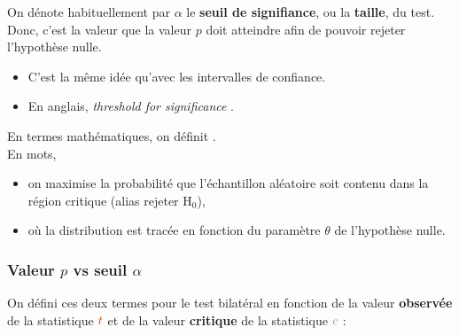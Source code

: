 \documentclass[10pt, french]{article}
\begin{document}
\begin{multicols*}{2}
\begin{definitionNOHFILLsub}
On dénote habituellement par $\alpha$ le \textbf{seuil de signifiance}, ou la \textbf{taille}, du test. Donc, c'est la valeur que la valeur $p$ doit atteindre afin de pouvoir rejeter l'hypothèse nulle.

\begin{itemize}
	\item	C'est la même idée qu'avec les intervalles de confiance. 
	\item	En anglais, \og \textit{threshold for significance} \fg{}.
\end{itemize}

\bigskip

En termes mathématiques, on définit . \\

En mots, 
\begin{itemize}
	\item	on \textcolor{indigo(web)}{maximise} la probabilité que \textcolor{bondiblue!80!black}{l'échantillon aléatoire} soit \textcolor{armygreen}{contenu} dans \textcolor{bulgarianrose!90!black}{la région critique} (alias rejeter $\textrm{H}_{0}$), 
	\item	où la distribution est tracée \textcolor{amethyst}{en fonction du paramètre $\theta$} de \textcolor{pastelred}{l'hypothèse nulle}.
\end{itemize}
\end{definitionNOHFILLsub}



\subsubsection{Valeur $p$ vs seuil $\alpha$}
On défini ces deux termes pour le test bilatéral en fonction de la valeur \textbf{\textcolor{burntorange}{observée}} de la statistique $\textcolor{burntorange}{t}$ et de la valeur \textbf{\textcolor{amethyst}{critique}} de la statistique $\textcolor{amethyst}{c}$ : \\


\end{multicols*}
\end{document}

